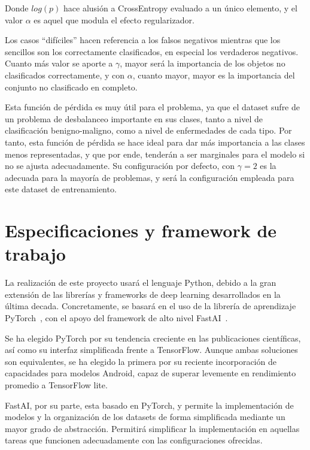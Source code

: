 Donde $log(p)$ hace alusión a CrossEntropy evaluado a un único elemento, y el valor $\alpha$ es aquel que modula el efecto regularizador.

Los casos ``difíciles'' hacen referencia a los falsos negativos mientras que los sencillos son los correctamente clasificados, en especial los verdaderos negativos. Cuanto más valor se aporte a $\gamma$, mayor será la importancia de los objetos no clasificados correctamente, y con $\alpha$, cuanto mayor, mayor es la importancia del conjunto no clasificado en completo.

Esta función de pérdida es muy útil para el problema, ya que el dataset sufre de un problema de desbalanceo importante en sus clases, tanto a nivel de clasificación benigno-maligno, como a nivel de enfermedades de cada tipo. Por tanto, esta función de pérdida se hace ideal para dar más importancia a las clases menos representadas, y que por ende, tenderán a ser marginales para el modelo si no se ajusta adecuadamente. Su configuración por defecto, con $\gamma = 2$ es la adecuada para la mayoría de problemas, y será la configuración empleada para este dataset de entrenamiento.

\section{Especificaciones y framework de trabajo}

La realización de este proyecto usará el lenguaje Python, debido a la gran extensión de las librerías y frameworks de deep learning desarrollados en la última decada. Concretamente, se basará en el uso de la librería de aprendizaje PyTorch~\cite{paszke2019pytorch}, con el apoyo del framework de alto nivel FastAI~\cite{howard2018fastai}.

Se ha elegido PyTorch por su tendencia creciente en las publicaciones científicas, así como su interfaz simplificada frente a TensorFlow. Aunque ambas soluciones son equivalentes, se ha elegido la primera por su reciente incorporación de capacidades para modelos Android, capaz de superar levemente en rendimiento promedio a TensorFlow lite.

FastAI, por su parte, esta basado en PyTorch, y permite la implementación de modelos y  la organización de los datasets de forma simplificada mediante un mayor grado de abstracción. Permitirá simplificar la implementación en aquellas tareas que funcionen adecuadamente con las configuraciones ofrecidas.\\

